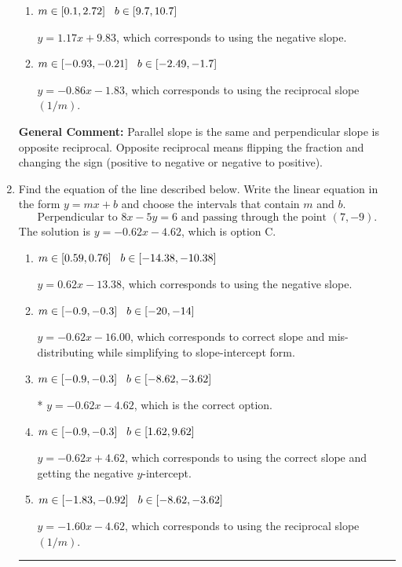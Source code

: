 \documentclass{extbook}[14pt]
\newcommand{\litem}[1]{\item #1

\rule{\textwidth}{0.4pt}}
\begin{document}
\begin{enumerate}
{\begin{enumerate}[label=\Alph*.]
* $y = -1.17x - 1.83$, which is the correct option.
\item \( m \in [0.1, 2.72] \hspace*{3mm} b \in [9.7, 10.7] \)

 $y = 1.17x + 9.83$, which corresponds to using the negative slope.
\item \( m \in [-0.93, -0.21] \hspace*{3mm} b \in [-2.49, -1.7] \)

 $y = -0.86x - 1.83$, which corresponds to using the reciprocal slope $(1/m)$.
\end{enumerate}

\textbf{General Comment:} Parallel slope is the same and perpendicular slope is opposite reciprocal. Opposite reciprocal means flipping the fraction and changing the sign (positive to negative or negative to positive).
}
\litem{
Find the equation of the line described below. Write the linear equation in the form $ y=mx+b $ and choose the intervals that contain $m$ and $b$.
\[ \text{Perpendicular to } 8 x - 5 y = 6 \text{ and passing through the point } (7, -9). \]The solution is \( y = -0.62x - 4.62 \), which is option C.\begin{enumerate}[label=\Alph*.]
\item \( m \in [0.59, 0.76] \hspace*{3mm} b \in [-14.38, -10.38] \)

 $y = 0.62x - 13.38$, which corresponds to using the negative slope.
\item \( m \in [-0.9, -0.3] \hspace*{3mm} b \in [-20, -14] \)

 $y = -0.62x - 16.00$, which corresponds to correct slope and mis-distributing while simplifying to slope-intercept form.
\item \( m \in [-0.9, -0.3] \hspace*{3mm} b \in [-8.62, -3.62] \)

* $y = -0.62x - 4.62$, which is the correct option.
\item \( m \in [-0.9, -0.3] \hspace*{3mm} b \in [1.62, 9.62] \)

 $y = -0.62x + 4.62$, which corresponds to using the correct slope and getting the negative $y$-intercept.
\item \( m \in [-1.83, -0.92] \hspace*{3mm} b \in [-8.62, -3.62] \)

 $y = -1.60x - 4.62$, which corresponds to using the reciprocal slope $(1/m)$.
\end{enumerate}

}
\end{enumerate}
\end{document}
